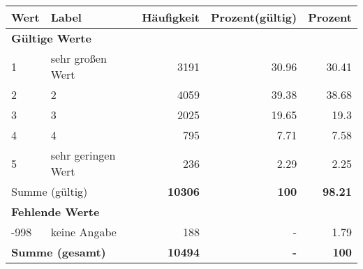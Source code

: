      \begin{longtable}{lXrrr}
     \toprule
     \textbf{Wert} & \textbf{Label} & \textbf{Häufigkeit} & \textbf{Prozent(gültig)} & \textbf{Prozent} \\
     \endhead
     \midrule
     \multicolumn{5}{l}{\textbf{Gültige Werte}}\\

     1 &
     \multicolumn{1}{X}{ sehr großen Wert   } &


       \num{3191} &
       \num[round-mode=places,round-precision=2]{30,96} &
         \num[round-mode=places,round-precision=2]{30,41} \\

     2 &
     \multicolumn{1}{X}{ 2   } &


       \num{4059} &
       \num[round-mode=places,round-precision=2]{39,38} &
         \num[round-mode=places,round-precision=2]{38,68} \\

     3 &
     \multicolumn{1}{X}{ 3   } &


       \num{2025} &
       \num[round-mode=places,round-precision=2]{19,65} &
         \num[round-mode=places,round-precision=2]{19,3} \\

     4 &
     \multicolumn{1}{X}{ 4   } &


       \num{795} &
       \num[round-mode=places,round-precision=2]{7,71} &
         \num[round-mode=places,round-precision=2]{7,58} \\

     5 &
     \multicolumn{1}{X}{ sehr geringen Wert   } &


       \num{236} &
       \num[round-mode=places,round-precision=2]{2,29} &
         \num[round-mode=places,round-precision=2]{2,25} \\
     \midrule
     \multicolumn{2}{l}{Summe (gültig)} &
       \textbf{\num{10306}} &
     \textbf{100} &
       \textbf{\num[round-mode=places,round-precision=2]{98,21}} \\
     \multicolumn{5}{l}{\textbf{Fehlende Werte}}\\
       -998 &
       keine Angabe &
         \num{188} &
        - &
         \num[round-mode=places,round-precision=2]{1,79} \\
     \midrule
     \multicolumn{2}{l}{\textbf{Summe (gesamt)}} &
          \textbf{\num{10494}} &
        \textbf{-} &
        \textbf{100} \\
     \bottomrule
     \end{longtable}
     
